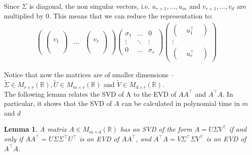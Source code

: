 \documentclass[11pt, oneside]{article}   	%
\newtheorem{lemma}{Lemma}
\begin{document}
Since $\Sigma$ is diagonal, the non singular vectors, i.e. $u_{r+1},\dots,u_{m}$ and $v_{r+1},\dots,v_{d}$ are multiplied by 0. This means that we can reduce the representation to:
\begin{eqnarray*}
\left(\begin{array}{ccc}
\left(\begin{array}{c}
\\
\\
v_{1}\\
\\
\\
\end{array}\right) & ... & \left(\begin{array}{c}
\\
\\
v_{r}\\
\\
\\
\end{array}\right)\end{array}\right)\left(\begin{array}{ccc}
\sigma_{1} & \ldots & 0\\
\vdots & \ddots & \vdots\\
0 & \ldots & \sigma_{r}
\end{array}\right)\left(\begin{array}{c}
\left(\begin{array}{ccccc}
 & u_{1}^{\top} & \end{array}\right)\\
\vdots\\
\left(\begin{array}{ccccc}
 & u_{r}^{\top} & \end{array}\right)
\end{array}\right)
\end{eqnarray*}

Notice that now the matrices are of smaller dimensions – $\tilde{\Sigma}\in M_{r\times r}(\mathbb{R}), \tilde{U}\in M_{m\times r}(\mathbb{R})$ and $\tilde{V}\in M_{d\times r}(\mathbb{R})$.\\

The following lemma relates the SVD of A to the EVD of $AA^{\top}$ and $A^{\top}A$. In particular, it shows that the SVD of $A$ can be calculated in polynomial time in $m$ and $d$

\begin{lemma}
A matrix $A\in M_{m\times d}(\mathbb{R})$ has an SVD of the form $A=U\Sigma V^{\top}$ if and only if $AA^{\top}=U\Sigma\Sigma^{\top}U^{\top}$ is an EVD of $AA^{\top}$, and $A^{\top}A=V\Sigma^{\top}\Sigma V^{\top}$ is an EVD of $A^{\top}A$.
\end{lemma}
\end{document}
